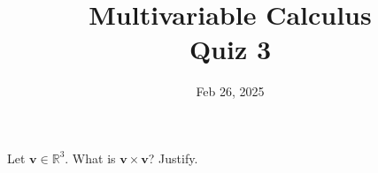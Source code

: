 \documentclass[aspectratio=169]{beamer}
\title{ Multivariable Calculus \\ Quiz 3}
\institute{Fulbright University Vietnam}
\date{Feb 26, 2025}
\begin{document}
\maketitle

\begin{frame}
    Let $\mathbf{v} \in \mathbb{R}^3$. What is $\mathbf{v}\times \mathbf{v}$? Justify.
\end{frame}
\end{document}
